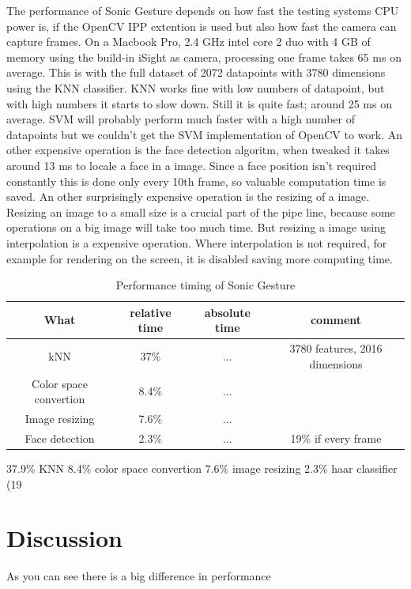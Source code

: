 The performance of Sonic Gesture depends on how fast the testing systems CPU power is, if the OpenCV IPP extention is used but also how fast the camera can capture frames. On a Macbook Pro, 2.4 GHz intel core 2 duo with 4 GB of memory using the build-in iSight as camera, processing one frame takes 65 ms on average. This is with the full dataset of 2072 datapoints with 3780 dimensions using the KNN classifier. KNN works fine with low numbers of datapoint, but with high numbers it starts to slow down. Still it is quite fast; around 25 ms on average. SVM will probably perform much faster with a high number of datapoints but we couldn't get the SVM implementation of OpenCV to work. An other expensive operation is the face detection algoritm, when tweaked it takes around 13 ms to locale a face in a image. Since a face position isn't required constantly this is done only every 10th frame, so valuable computation time is saved. An other surprisingly expensive operation is the resizing of a image. Resizing an image to a small size is a crucial part of the pipe line, because some operations on a big image will take too much time. But resizing a image using interpolation is a expensive operation. Where interpolation is not required, for example for rendering on the screen, it is disabled saving more computing time. 



\begin{table}
\centering
\begin{tabular}{cccc}
What & relative time & absolute time & comment \\
\hline
kNN & 37\% & ... & 3780 features, 2016 dimensions \\
Color space convertion & 8.4\% & ... & \\
Image resizing & 7.6\% & ... & \\
Face detection & 2.3\% & ... &  19\% if every frame \\
\end{tabular}
\caption{Performance timing of Sonic Gesture}
\end{table}


37.9\% KNN
8.4\% color space convertion
7.6\% image resizing
2.3\% haar classifier (19%

\section{Discussion}
As you can see there is a big difference in performance



